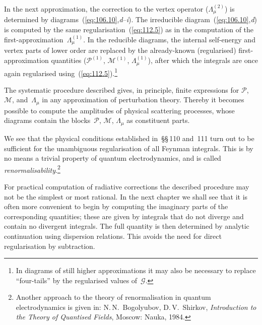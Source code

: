In the next approximation, the correction to the vertex operator ($\Lambda^{(2)}_\mu$) is determined by diagrams~(\ref{eq:106.10},\textit{d}--\textit{i}). The irreducible diagram~(\ref{eq:106.10},\textit{d}) is computed by the same regularisation~(\ref{eq:112.5}) as in the computation of the first-approximation~$\Lambda^{(1)}_\mu$. In the reducible diagrams, the internal self-energy and vertex parts of lower order are replaced by the already-known (regularised) first-approximation quantities ($\mathcal{P}^{(1)}$, $\mathcal{M}^{(1)}$, $\Lambda^{(1)}_\mu$), after which the integrals are once again regularised using~(\ref{eq:112.5}).\footnote{In diagrams of still higher approximations it may also be necessary to replace ``four-tails'' by the regularised values of~$\mathcal{G}$.}

The systematic procedure described gives, in principle, finite expressions for $\mathcal{P}$, $\mathcal{M}$, and~$\Lambda_\mu$ in any approximation of perturbation theory. Thereby it becomes possible to compute the amplitudes of physical scattering processes, whose diagrams contain the blocks~$\mathcal{P}$, $\mathcal{M}$, $\Lambda_\mu$ as constituent parts.

We see that the physical conditions established in~\S\S\,110 and~111 turn out to be sufficient for the unambiguous regularisation of all Feynman integrals. This is by no means a trivial property of quantum electrodynamics, and is called \emph{renormalisability}.\footnote{Another approach to the theory of renormalisation in quantum electrodynamics is given in: N.\,N.~Bogolyubov, D.\,V.~Shirkov, \textit{Introduction to the Theory of Quantised Fields}, Moscow: Nauka, 1984.}


For practical computation of radiative corrections the described procedure may not be the simplest or most rational. In the next chapter we shall see that it is often more convenient to begin by computing the imaginary parts of the corresponding quantities; these are given by integrals that do not diverge and contain no divergent integrals. The full quantity is then determined by analytic continuation using dispersion relations. This avoids the need for direct regularisation by subtraction.
